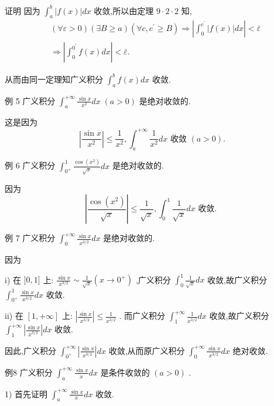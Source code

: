 证明 因为 ${\int }_{a}^{b}\left| {f\left( x\right) }\right| {dx}$ 收敛,所以由定理 $9 \cdot  2 \cdot  2$ 知,
\begin{align*}
	&\left( {\forall \varepsilon  > 0}\right) \left( {\exists B \geq  a}\right) \left( {\forall c,{c}^{\prime } \geq  B}\right)  \Rightarrow  \left| {{\int }_{0}^{{c}^{\prime }}\left| {f\left( x\right) }\right| {dx}}\right|  < \bar{\varepsilon }\\
	&\Rightarrow  \left| {{\int }_{0}^{{0}^{\prime }}f\left( x\right) {dx}}\right|  < \bar{\varepsilon }.
\end{align*}

从而由同一定理知广义积分 ${\int }_{a}^{b}f\left( x\right) {dx}$ 收敛.

例 5 广义积分 ${\int }_{a}^{+\infty }\frac{\sin x}{{x}^{2}}{dx}\;\left( {a > 0}\right)$ 是绝对收敛的.

这是因为
$$\left| \frac{\sin x}{{x}^{2}}\right|  \leq  \frac{1}{{x}^{2}},{\int }_{a}^{+\infty }\frac{1}{{x}^{2}}{dx}\text{ 收敛 }\left( {a > 0}\right) .$$

例 6 广义积分 ${\int }_{{0}^{ + }}^{1}\frac{\cos \left( {x}^{2}\right) }{\sqrt{x}}{dx}$ 是绝对收敛的.

因为
$$\left| \frac{\cos \left( {x}^{2}\right) }{\sqrt{x}}\right|  \leq  \frac{1}{\sqrt{x}},{\int }_{0}^{1}\frac{1}{\sqrt{x}}{dx}\text{ 收敛. }$$

例 7 广义积分 ${\int }_{0}^{+\infty }\frac{\sin x}{{x}^{3/2}}{dx}$ 是绝对收敛的.

因为

i) 在 $\rbrack 0,1\rbrack$ 上: $\frac{\sin x}{{x}^{3/2}} \sim  \frac{1}{\sqrt{x}}\left( {x \rightarrow  {0}^{ + }}\right)$ ,广义积分 ${\int }_{0}^{1}\frac{1}{\sqrt{x}}{dx}$ 收敛,故广义积分 ${\int }_{{0}^{ + }}^{1}\frac{\sin x}{{x}^{3/2}}{dx}$ 收敛.

ii) 在 $\left\lbrack  {1, + \infty }\right\rbrack$ 上: $\left| \frac{\sin x}{{x}^{3/2}}\right|  \leq  \frac{1}{{x}^{3/2}}$ . 而广义积分 ${\int }_{1}^{+\infty }\frac{1}{{x}^{3/2}}{dx}$ 收敛,故广义积分 ${\int }_{1}^{+\infty }\left| \frac{\sin x}{{x}^{3/2}}\right| {dx}$ 收敛.

因此,广义积分 ${\int }_{{0}^{ + }}^{+\infty }\left| \frac{\sin x}{{x}^{3/2}}\right| {dx}$ 收敛,从而原广义积分 ${\int }_{0}^{+\infty }\frac{\sin x}{{x}^{3/2}}{dx}$ 绝对收敛.

例8 广义积分 ${\int }_{a}^{+\infty }\frac{\sin x}{x}{dx}$ 是条件收敛的 $\left( {a > 0}\right)$ .

1) 首先证明 ${\int }_{a}^{+\infty }\frac{\sin x}{x}{dx}$ 收敛.

